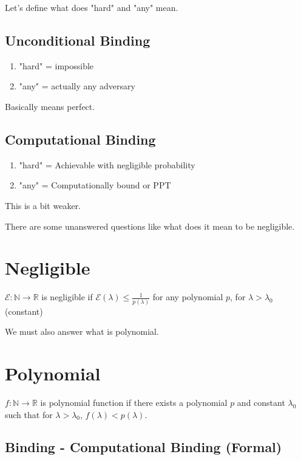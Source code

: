 \documentclass{article}
\begin{document}
Let's define what does "hard" and "any" mean.

\subsection{Unconditional Binding}

\begin{enumerate}
    \item "hard" = impossible
    \item "any" = actually any adversary
\end{enumerate}

Basically means perfect.

\subsection{Computational Binding}

\begin{enumerate}
    \item "hard" = Achievable with negligible probability
    \item "any" = Computationally bound or PPT
\end{enumerate}

This is a bit weaker.

There are some unanswered questions like what does it mean to be negligible.

\section{Negligible}

$\mathcal{E}:\mathbb N \rightarrow \mathbb R$ is negligible if $\mathcal{E}(\lambda) \leq \frac{1}{p(\lambda)}$ for any polynomial $p$, for $\lambda > \lambda_0$ (constant)

We must also answer what is polynomial.

\section{Polynomial}

$f:\mathbb N \rightarrow \mathbb R$ is polynomial function if there exists a polynomial $p$ and constant $\lambda_0$ such that for $\lambda > \lambda_0$, $f(\lambda) < p(\lambda)$.

\subsection{Binding - Computational Binding (Formal)}
\end{document}
